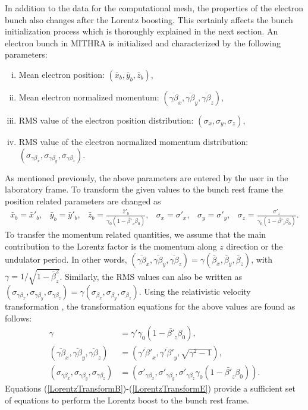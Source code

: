 In addition to the data for the computational mesh, the properties of the electron bunch also changes after the Lorentz boosting.
%
This certainly affects the bunch initialization process which is thoroughly explained in the next section.
%
An electron bunch in MITHRA is initialized and characterized by the following parameters:
%
\begin{enumerate}[(i)]
\item Mean electron position: $(\bar{x}_b, \bar{y}_b, \bar{z}_b)$,
\item Mean electron normalized momentum: $(\overline{\gamma \beta}_x, \overline{\gamma \beta}_y, \overline{\gamma \beta}_z)$,
\item RMS value of the electron position distribution: $(\sigma_x, \sigma_y, \sigma_z)$,
\item RMS value of the electron normalized momentum distribution: $(\sigma_{\gamma \beta_x}, \sigma_{\gamma \beta_y}, \sigma_{\gamma \beta_z})$.
\end{enumerate}
%
As mentioned previously, the above parameters are entered by the user in the laboratory frame.
%
To transform the given values to the bunch rest frame the position related parameters are changed as
%
\begin{equation}
\begin{array}{cccccc}
\bar{x}_b = \bar{x}'_b, & \bar{y}_b = \bar{y}'_b, & \bar{z}_b = \displaystyle \frac{\bar{z}'_b}{\gamma_0 (1 - \bar{\beta'}_z \beta_0)} , & \sigma_x = \sigma'_x, & \sigma_y = \sigma'_y, & \sigma_z = \displaystyle \frac{\sigma'_z}{{\gamma_0 (1 - \bar{\beta'}_z \beta_0)}}.
\end{array}
\end{equation}
%
To transfer the momentum related quantities, we assume that the main contribution to the Lorentz factor is the momentum along $z$ direction or the undulator period.
%
In other words, $(\overline{\gamma \beta}_x, \overline{\gamma \beta}_y, \overline{\gamma \beta}_z) = \gamma ( \bar{\beta}_x, \bar{\beta}_y, \bar{\beta}_z )$, with $\gamma = 1/\sqrt{1-\bar{\beta}_z^2}$.
%
Similarly, the RMS values can also be written as $(\sigma_{\gamma \beta_x}, \sigma_{\gamma \beta_y}, \sigma_{\gamma \beta_z}) = \gamma (\sigma_{\beta_x}, \sigma_{\beta_y}, \sigma_{\beta_z})$.
%
Using the relativistic velocity transformation \cite{JacksonClassical}, the transformation equations for the above values are found as follows:
%
\begin{align}
\gamma & = \gamma' \gamma_0 (1 - \bar{\beta'}_z \beta_0), \\
( \overline{\gamma \beta}_x, \overline{\gamma \beta}_y, \overline{\gamma \beta}_z ) & = ( \overline{\gamma' \beta'}_x, \overline{\gamma' \beta'}_y, \sqrt{\gamma^2-1} ), \\
(\sigma_{\gamma \beta_x}, \sigma_{\gamma \beta_y}, \sigma_{\gamma \beta_z}) & = ( \sigma'_{\gamma \beta_x}, \sigma'_{\gamma \beta_y}, \sigma'_{\gamma \beta_z} \gamma_0 (1 - \bar{\beta'}_z \beta_0) ). \label{LorentzTransformE}
\end{align}
%
Equations (\ref{LorentzTransformB})-(\ref{LorentzTransformE}) provide a sufficient set of equations to perform the Lorentz boost to the bunch rest frame.

